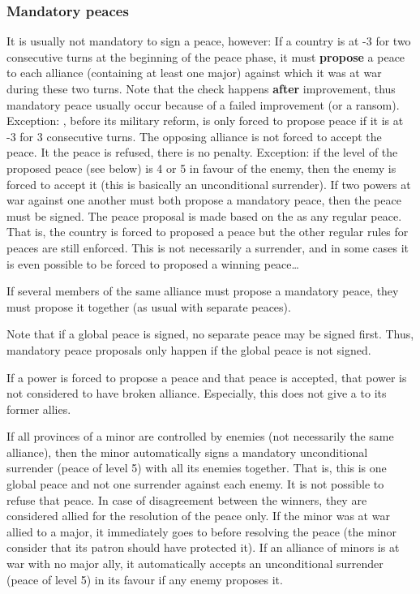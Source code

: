 \subsubsection{Mandatory peaces}\label{chPeace:Mandatory peaces}
 It is usually not mandatory to sign a
peace, however:
\bparag If a country is at -3 \STAB for two consecutive turns at the beginning
of the peace phase, it must \textbf{propose} a peace to each alliance
(containing at least one major) against which it was at war during these two
turns. Note that the check happens \textbf{after} \STAB improvement, thus
mandatory peace usually occur because of a failed improvement (or a ransom).
\bparag Exception: \RUS, before its military reform, is only forced to propose
peace if it is at -3 \STAB for 3 consecutive turns.
\bparag The opposing alliance is not forced to accept the peace. It the peace
is refused, there is no penalty.
\bparag Exception: if the level of the proposed peace (see below) is 4 or 5 in
favour of the enemy, then the enemy is forced to accept it (this is basically
an unconditional surrender).
\bparag If two powers at war against one another must both propose a mandatory
peace, then the peace must be signed.
\bparag The peace proposal is made based on the  as
any regular peace. That is, the country is forced to proposed a peace but the
other regular rules for peaces are still enforced. This is not necessarily a
surrender, and in some cases it is even possible to be forced to proposed a
winning peace\ldots

\bparag If several members of the same alliance must propose a mandatory
peace, they must propose it together (as usual with separate peaces).

 Note that if a global peace is
signed, no separate peace may be signed first. Thus, mandatory peace proposals
only happen if the global peace is not signed.

\bparag If a power is forced to propose a peace and that peace is accepted,
that power is not considered to have broken alliance.
\bparag Especially, this does not give a \CB to its former allies.

\label{chPeace:Mandatory peace minors}
\bparag If all provinces of a minor are controlled by enemies (not necessarily
the same alliance), then the minor automatically signs a mandatory
unconditional surrender (peace of level 5) with all its enemies together. That
is, this is one global peace and not one surrender against each enemy.
\bparag It is not possible to refuse that peace. In case of disagreement
between the winners, they are considered allied for the resolution of the
peace only.
\bparag If the minor was at war allied to a major, it immediately goes to
\Neutral before resolving the peace (the minor consider that its patron should
have protected it).
\bparag If an alliance of minors is at war with no major ally, it
automatically accepts an unconditional surrender (peace of level 5) in its
favour if any enemy proposes it.

